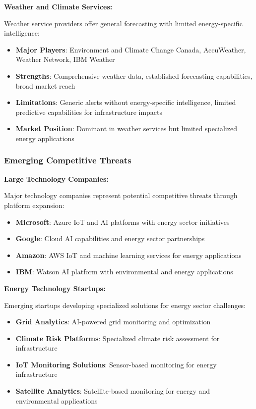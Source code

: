 \textbf{Weather and Climate Services:}

Weather service providers offer general forecasting with limited energy-specific intelligence:

\begin{itemize}
    \item \textbf{Major Players}: Environment and Climate Change Canada, AccuWeather, Weather Network, IBM Weather
    \item \textbf{Strengths}: Comprehensive weather data, established forecasting capabilities, broad market reach
    \item \textbf{Limitations}: Generic alerts without energy-specific intelligence, limited predictive capabilities for infrastructure impacts
    \item \textbf{Market Position}: Dominant in weather services but limited specialized energy applications
\end{itemize}

\subsubsection{Emerging Competitive Threats}

\textbf{Large Technology Companies:}

Major technology companies represent potential competitive threats through platform expansion:

\begin{itemize}
    \item \textbf{Microsoft}: Azure IoT and AI platforms with energy sector initiatives
    \item \textbf{Google}: Cloud AI capabilities and energy sector partnerships
    \item \textbf{Amazon}: AWS IoT and machine learning services for energy applications
    \item \textbf{IBM}: Watson AI platform with environmental and energy applications
\end{itemize}

\textbf{Energy Technology Startups:}

Emerging startups developing specialized solutions for energy sector challenges:

\begin{itemize}
    \item \textbf{Grid Analytics}: AI-powered grid monitoring and optimization
    \item \textbf{Climate Risk Platforms}: Specialized climate risk assessment for infrastructure
    \item \textbf{IoT Monitoring Solutions}: Sensor-based monitoring for energy infrastructure
    \item \textbf{Satellite Analytics}: Satellite-based monitoring for energy and environmental applications
\end{itemize}


